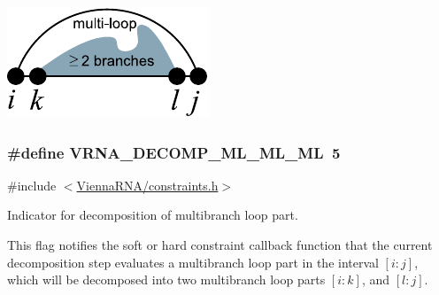  
\begin{DoxyImageNoCaption}
  \mbox{\includegraphics[width=\textwidth,height=\textheight/2,keepaspectratio=true]{decomp_ml}}
\end{DoxyImageNoCaption}
 \hypertarget{group__constraints_ga735517266f2e35e1374b8f1ea77ef23e}{}
\subsubsection[{V\+R\+N\+A\+\_\+\+D\+E\+C\+O\+M\+P\+\_\+\+M\+L\+\_\+\+M\+L\+\_\+\+M\+L}]{\setlength{\rightskip}{0pt plus 5cm}\#define V\+R\+N\+A\+\_\+\+D\+E\+C\+O\+M\+P\+\_\+\+M\+L\+\_\+\+M\+L\+\_\+\+M\+L~5}\label{group__constraints_ga735517266f2e35e1374b8f1ea77ef23e}


{\ttfamily \#include $<$\hyperlink{constraints_8h}{Vienna\+R\+N\+A/constraints.\+h}$>$}



Indicator for decomposition of multibranch loop part. 

This flag notifies the soft or hard constraint callback function that the current decomposition step evaluates a multibranch loop part in the interval $[i:j]$, which will be decomposed into two multibranch loop parts $[i:k]$, and $[l:j]$.

